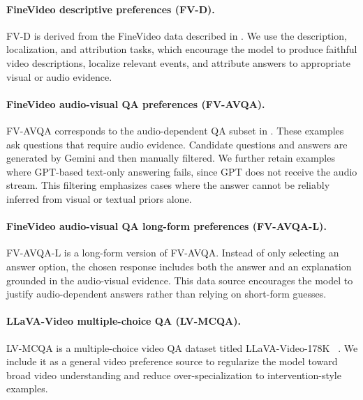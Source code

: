 \paragraph{FineVideo descriptive preferences (FV-D).}
FV-D is derived from the FineVideo data described in . We use the description, localization, and attribution tasks, which encourage the model to produce faithful video descriptions, localize relevant events, and attribute answers to appropriate visual or audio evidence.

\paragraph{FineVideo audio-visual QA preferences (FV-AVQA).}
FV-AVQA corresponds to the audio-dependent QA subset in . These examples ask questions that require audio evidence. Candidate questions and answers are generated by Gemini and then manually filtered. We further retain examples where GPT-based text-only answering fails, since GPT does not receive the audio stream. This filtering emphasizes cases where the answer cannot be reliably inferred from visual or textual priors alone.

\paragraph{FineVideo audio-visual QA long-form preferences (FV-AVQA-L).}
FV-AVQA-L is a long-form version of FV-AVQA. Instead of only selecting an answer option, the chosen response includes both the answer and an explanation grounded in the audio-visual evidence. This data source encourages the model to justify audio-dependent answers rather than relying on short-form guesses.

\paragraph{LLaVA-Video multiple-choice QA (LV-MCQA).}
LV-MCQA is a multiple-choice video QA dataset titled LLaVA-Video-178K ~\cite{zhang2024videoinstructiontuningsynthetic}. We include it as a general video preference source to regularize the model toward broad video understanding and reduce over-specialization to intervention-style examples.


